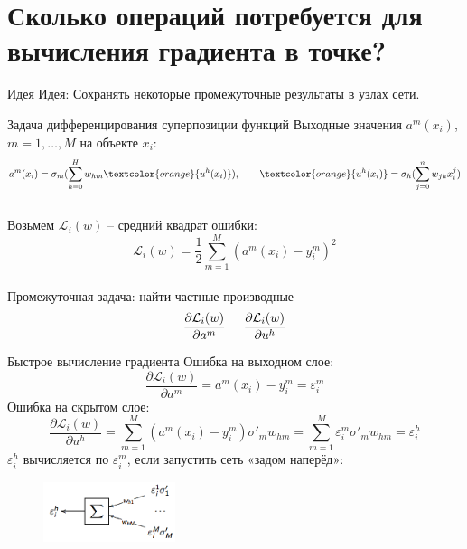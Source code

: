 \documentclass[10pt]{beamer}
\begin{document}
\section{Сколько операций потребуется для вычисления градиента в точке?}

\begin{frame}{Идея}
  \alert{Идея}: Сохранять некоторые промежуточные результаты в узлах сети.
\end{frame}

\begin{frame}{Задача дифференцирования суперпозиции функций}
	Выходные значения $a^m(x_i)$, $m = 1,\dots,M$ на объекте $x_i$:\\
	$$a^m(x_i) = \sigma_m (\sum\limits_{h=0}^H w_{hm} \textcolor{orange}{u^h(x_i)}), \qquad \textcolor{orange}{u^h(x_i)} = \sigma_h (\sum\limits_{j=0}^n w_{jh} x_i^j)$$\\
	\bigbreak
	\pause
	Возьмем $\mathcal{L}_i(w)$ -- средний квадрат ошибки:\\
	$$\mathcal{L}_i(w) = \frac{1}{2} \sum\limits_{m=1}^M (a^m(x_i) - y_i^m)^2$$\\
	\bigbreak
	\pause
	Промежуточная задача: найти частные производные\\
	$$\frac {\partial \mathcal{L}_i(w)}{\partial a^m} \hspace{5mm} \frac {\partial \mathcal{L}_i(w)}{\partial u^h}$$
\end{frame}

\begin{frame}{Быстрое вычисление градиента}
  Ошибка на выходном слое:	
	$$\frac{\partial \mathcal{L}_i(w)}{\partial a^m} = a^m (x_i) - y_i^m = \varepsilon^m_i$$ 
	\bigbreak
	\pause
	Ошибка на скрытом слое:	
	$$\frac{\partial \mathcal{L}_i(w)}{\partial u^h} = \sum\limits_{m=1}^M (a^m(x_i) - y_i^m) \sigma'_m w_{hm} = \sum\limits_{m=1}^M \varepsilon^m_i \sigma'_m w_{hm} = \varepsilon^h_i$$
	\bigbreak
	\pause
	$\varepsilon_i^h$ вычисляется по $\varepsilon_i^m$, если запустить сеть «задом наперёд»:\\
	
	\begin{figure}[htbp]
	  \includegraphics[height=50pt, keepaspectratio = true]{images/backpropagation}   
	\end{figure}

\end{frame}
\end{document}
